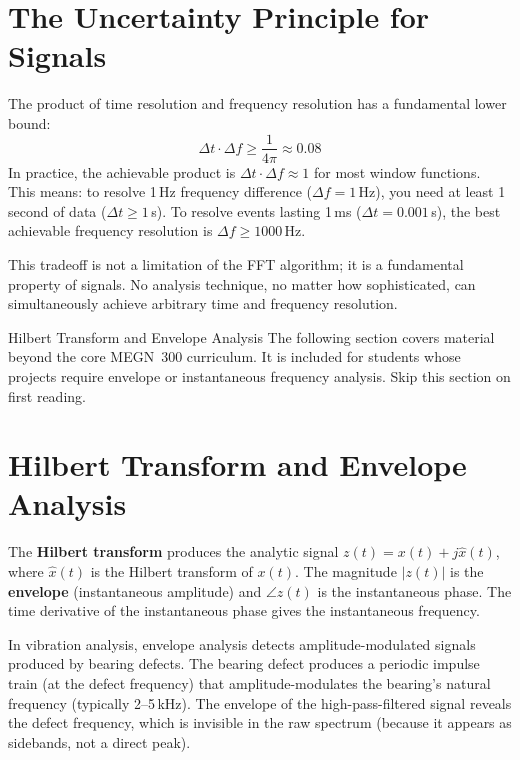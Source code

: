 \documentclass[11pt,letterpaper,twoside,openany]{book}
\begin{document}
\section{The Uncertainty Principle for Signals}
The product of time resolution and frequency resolution has a fundamental lower bound:
\begin{equation}
\Delta t \cdot \Delta f \geq \frac{1}{4\pi} \approx 0.08
\end{equation}
In practice, the achievable product is $\Delta t \cdot \Delta f \approx 1$ for most window functions. This means: to resolve 1\,Hz frequency difference ($\Delta f = 1$\,Hz), you need at least 1 second of data ($\Delta t \geq 1$\,s). To resolve events lasting 1\,ms ($\Delta t = 0.001$\,s), the best achievable frequency resolution is $\Delta f \geq 1000$\,Hz.

This tradeoff is not a limitation of the FFT algorithm; it is a fundamental property of signals. No analysis technique, no matter how sophisticated, can simultaneously achieve arbitrary time and frequency resolution.

\begin{advancedbox}{Hilbert Transform and Envelope Analysis}
The following section covers material beyond the core MEGN~300 curriculum. It is included for students whose projects require envelope or instantaneous frequency analysis. Skip this section on first reading.
\end{advancedbox}
\section{Hilbert Transform and Envelope Analysis}
The \textbf{Hilbert transform} produces the analytic signal $z(t) = x(t) + j\hat{x}(t)$, where $\hat{x}(t)$ is the Hilbert transform of $x(t)$. The magnitude $|z(t)|$ is the \textbf{envelope} (instantaneous amplitude) and $\angle z(t)$ is the instantaneous phase. The time derivative of the instantaneous phase gives the instantaneous frequency.

In vibration analysis, envelope analysis detects amplitude-modulated signals produced by bearing defects. The bearing defect produces a periodic impulse train (at the defect frequency) that amplitude-modulates the bearing's natural frequency (typically 2--5\,kHz). The envelope of the high-pass-filtered signal reveals the defect frequency, which is invisible in the raw spectrum (because it appears as sidebands, not a direct peak).
\end{document}
